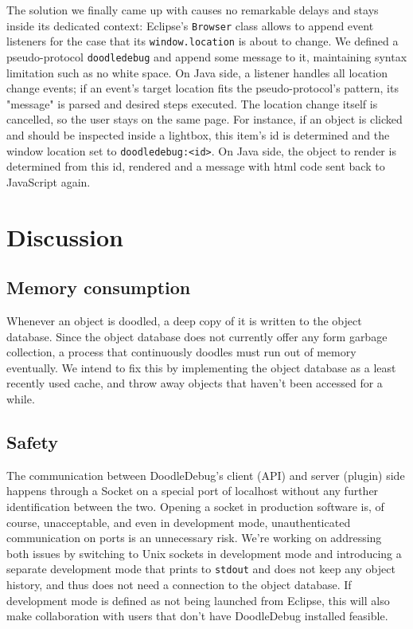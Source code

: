 \documentclass[english]{acm_proc_article-sp}
\begin{document}
The solution we finally came up with causes no remarkable delays and stays inside its dedicated context: Eclipse's \verb.Browser. 
class allows to append event listeners for the case that its \verb-window.location- is about to change. 
We defined a pseudo-protocol \verb-doodledebug- and append some message to it, maintaining syntax limitation such as no white space. 
On Java side, a listener handles all location change events; if an event's target location fits the pseudo-protocol's pattern, its "message" is parsed and desired steps executed. 
The location change itself is cancelled, so the user stays on the same page. 
For instance, if an object is clicked and should be inspected inside a lightbox, this item's id is determined and the window location set to \verb-doodledebug:<id>-. 
On Java side, the object to render is determined from this id, rendered and a message with html code sent back to JavaScript again.

\section{Discussion}
\subsection{Memory consumption}
Whenever an object is doodled, a deep copy of it is written to the object database. Since the object database does not currently offer any form garbage collection, a process that continuously doodles must run out of memory eventually. We intend to fix this by implementing the object database as a least recently used cache, and throw away objects that haven't been accessed for a while.

\subsection{Safety}
The communication between DoodleDebug's client (API) and server (plugin) side happens through a Socket on a special port of localhost without any further identification between the two. 
Opening a socket in production software is, of course, unacceptable, and even in development mode, unauthenticated communication on ports is an unnecessary risk. 
We're working on addressing both issues by switching to Unix sockets in development mode and introducing a separate development mode that prints to \verb-stdout- and does not keep any object history, and thus does not need a connection to the object database. If development mode is defined as not being launched from Eclipse, this will also make collaboration with users that don't have DoodleDebug installed feasible.
\end{document}
